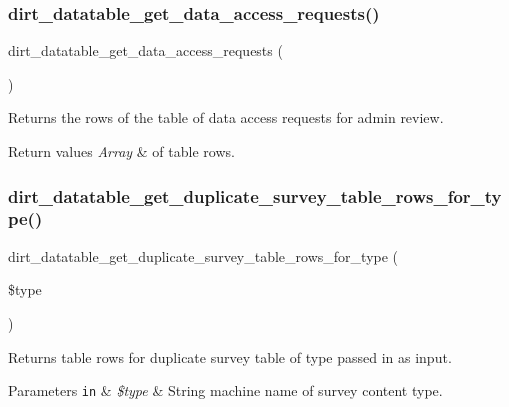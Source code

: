 \subsubsection{\texorpdfstring{dirt\+\_\+datatable\+\_\+get\+\_\+data\+\_\+access\+\_\+requests()}{dirt\_datatable\_get\_data\_access\_requests()}}
{\footnotesize\ttfamily dirt\+\_\+datatable\+\_\+get\+\_\+data\+\_\+access\+\_\+requests (\begin{DoxyParamCaption}{ }\end{DoxyParamCaption})}

Returns the rows of the table of data access requests for admin review.


\begin{DoxyRetVals}{Return values}
{\em Array} & of table rows. \\
\hline
\end{DoxyRetVals}
\mbox{\label{dirt__datatable_8admin_8inc_a56d0fb7ce2f22388f592a876f7111173}} 
\subsubsection{\texorpdfstring{dirt\+\_\+datatable\+\_\+get\+\_\+duplicate\+\_\+survey\+\_\+table\+\_\+rows\+\_\+for\+\_\+type()}{dirt\_datatable\_get\_duplicate\_survey\_table\_rows\_for\_type()}}
{\footnotesize\ttfamily dirt\+\_\+datatable\+\_\+get\+\_\+duplicate\+\_\+survey\+\_\+table\+\_\+rows\+\_\+for\+\_\+type (\begin{DoxyParamCaption}\item[{}]{\$type }\end{DoxyParamCaption})}

Returns table rows for duplicate survey table of type passed in as input.


\begin{DoxyParams}[1]{Parameters}
\mbox{\tt in}  & {\em \$type} & String machine name of survey content type.\\
\hline
\end{DoxyParams}

